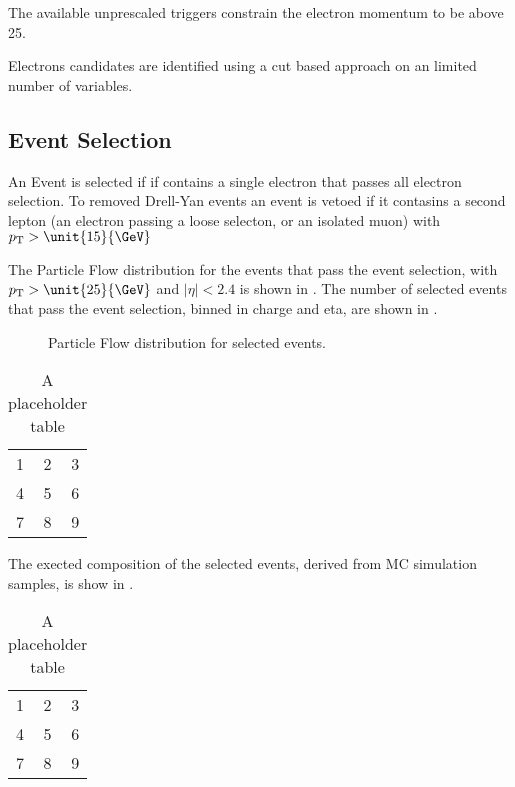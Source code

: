 The available unprescaled triggers constrain the electron momentum to be above
\unit{25}{\GeV}.

Electrons candidates are identified using a cut based approach on an limited
number of variables.


\subsection{Event Selection}

An Event is selected if if contains a single electron that passes all electron
selection.
To removed Drell-Yan events an event is vetoed if it contasins a second lepton
(an electron passing a loose selecton, or an isolated muon) with $\pt > 
\unit{15}{\GeV}$

The Particle Flow \ETm distribution for the events that pass the event
selection, with $\pt > \unit{25}{\GeV}$ and $|\eta| < 2.4$ is shown in
.
The number of selected events that pass the event selection, binned in charge 
and eta, are shown in . 

\begin{figure}[htb]
  \centering
  \caption{Particle Flow \ETm distribution for selected events.}
  \label{asym36:pfmet}
\end{figure}

\begin{table}[htb]
  \centering
  \begin{tabular}{| l c r |}
    \hline
    1 & 2 & 3 \\
    4 & 5 & 6 \\
    7 & 8 & 9 \\
  \hline
  \end{tabular}
  \caption{A placeholder table}
  \label{asym36:selectedevents}
\end{table}
                           
The exected composition of the selected events, derived from MC simulation
samples, is show in . 

\begin{table}[htb]
  \centering
  \begin{tabular}{| l c r |}
    \hline
    1 & 2 & 3 \\
    4 & 5 & 6 \\
    7 & 8 & 9 \\
  \hline
  \end{tabular}
  \caption{A placeholder table}
  \label{asym36:selectedcomp}
\end{table}


